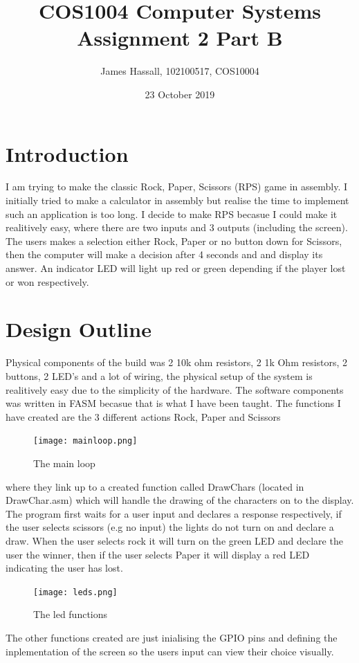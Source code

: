 \documentclass{article}
\title{COS1004 Computer Systems Assignment 2 Part B}
\author{James Hassall, 102100517, COS10004}
\date{23 October 2019}
\begin{document}
\maketitle

\pagebreak
\section*{Introduction}
I am trying to make the classic Rock, Paper, Scissors (RPS) game in assembly. I initially tried to make
a calculator in assembly but realise the time to implement such an application is too long. I 
decide to make RPS becasue I could make it realitively easy, where there are two inputs and 3 outputs
(including the screen). The users makes a selection either Rock, Paper or no button down for Scissors, 
then the computer will make a decision after 4 seconds and and display its answer.  An indicator LED 
will light up red or green depending if the player lost or won respectively.

\section*{Design Outline}
Physical components of the build was 2 10k ohm resistors, 2 1k Ohm resistors, 2 buttons,
2 LED's and a lot of wiring, the physical setup of the system is realitively easy due to the simplicity
of the hardware. The software components was written in FASM becasue that is what I have been taught.
The functions I have created are the 3 different actions Rock, Paper and Scissors
\begin{figure}[h]
    \centering
    \texttt{[image: mainloop.png]}
    \caption{The main loop}
\end{figure}
where they link up to a created function called DrawChars (located in DrawChar.asm) which will handle the drawing of the characters
on to the display.
\\
The program first waits for a user input and declares a response respectively, if the user selects scissors (e.g no input) the lights
do not turn on and declare a draw. When the user selects rock it will turn on the green LED and declare the user the winner, then if
the user selects Paper it will display a red LED indicating the user has lost.
\begin{figure}[h]
    \centering
    \texttt{[image: leds.png]}
    \caption{The led functions}
\end{figure}

The other functions created are just inialising the GPIO pins and defining the inplementation of the screen so the users input can view
their choice visually.
\end{document}
